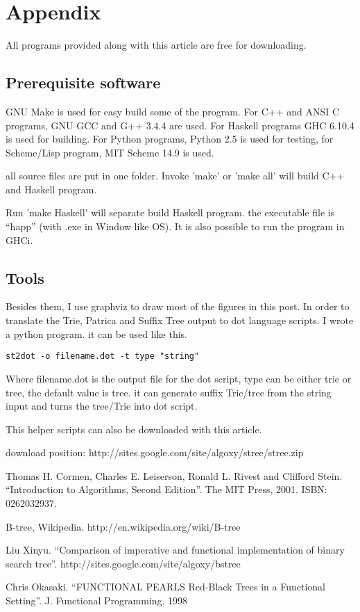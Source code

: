 \documentclass{article}
\begin{document}
\section{Appendix} \label{appendix}
All programs provided along with this article are free for
downloading.

\subsection{Prerequisite software}
GNU Make is used for easy build some of the program. For C++ and ANSI C programs,
GNU GCC and G++ 3.4.4 are used. 
For Haskell programs GHC 6.10.4 is used
for building. For Python programs, Python 2.5 is used for testing, for
Scheme/Lisp program, MIT Scheme 14.9 is used.

all source files are put in one folder. Invoke 'make' or 'make all'
will build C++ and Haskell program. 

Run 'make Haskell' will separate build Haskell program. the executable
file is ``happ'' (with .exe
in Window like OS). It is also possible to run the program in GHCi.

\subsection{Tools}

Besides them, I use graphviz to draw most of the figures in this post. In order to
translate the Trie, Patrica and Suffix Tree output to dot language scripts. I wrote a python program.
it can be used like this.

\begin{verbatim}
st2dot -o filename.dot -t type "string"
\end{verbatim}

Where filename.dot is the output file for the dot script, type can be
either trie or tree, the default value is tree. it can generate suffix
Trie/tree from the string input and turns the tree/Trie into dot script.

This helper scripts can also be downloaded with this article.

download position: http://sites.google.com/site/algoxy/stree/stree.zip

\begin{thebibliography}{99}

Thomas H. Cormen, Charles E. Leiserson, Ronald L. Rivest and Clifford Stein. ``Introduction to Algorithms, Second Edition''. The MIT Press, 2001. ISBN: 0262032937.

B-tree, Wikipedia. http://en.wikipedia.org/wiki/B-tree

Liu Xinyu. ``Comparison of imperative and functional implementation of
binary search tree''. http://sites.google.com/site/algoxy/bstree

Chris Okasaki. ``FUNCTIONAL PEARLS Red-Black Trees in a Functional Setting''. J. Functional Programming. 1998

\end{thebibliography}

\ifx\wholebook\relax \else
\end{document}
